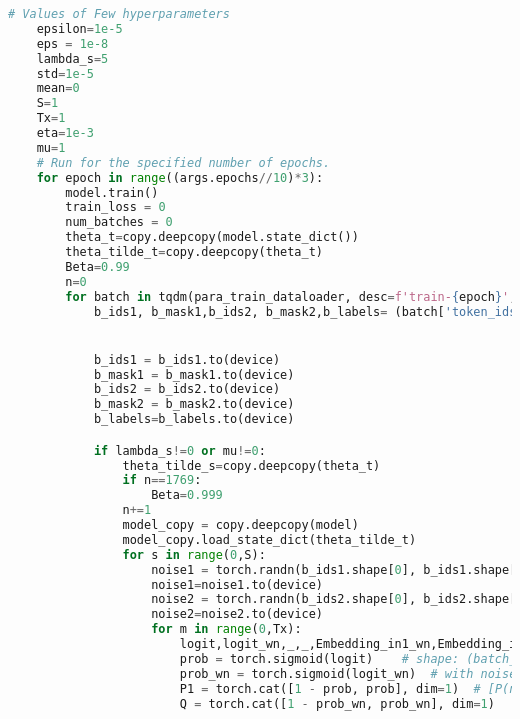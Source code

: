 \begin{lstlisting}[language=Python, caption={Paraphrase Detection Training with SMART}, label={lst:QQP_SMART}, basicstyle=\ttfamily\small, keywordstyle=\color{blue}, commentstyle=\color{green}, stringstyle=\color{red},linewidth=\textwidth]
    # Values of Few hyperparameters
    epsilon=1e-5
    eps = 1e-8
    lambda_s=5
    std=1e-5
    mean=0
    S=1
    Tx=1
    eta=1e-3
    mu=1
    # Run for the specified number of epochs.
    for epoch in range((args.epochs//10)*3):
        model.train()
        train_loss = 0
        num_batches = 0
        theta_t=copy.deepcopy(model.state_dict())
        theta_tilde_t=copy.deepcopy(theta_t)
        Beta=0.99
        n=0
        for batch in tqdm(para_train_dataloader, desc=f'train-{epoch}', disable=TQDM_DISABLE):
            b_ids1, b_mask1,b_ids2, b_mask2,b_labels= (batch['token_ids_1'], batch['attention_mask_1'],batch['token_ids_2'], batch['attention_mask_2'],batch['labels'])


            b_ids1 = b_ids1.to(device)
            b_mask1 = b_mask1.to(device)
            b_ids2 = b_ids2.to(device)
            b_mask2 = b_mask2.to(device)
            b_labels=b_labels.to(device)

            if lambda_s!=0 or mu!=0:
                theta_tilde_s=copy.deepcopy(theta_t)
                if n==1769:
                    Beta=0.999
                n+=1
                model_copy = copy.deepcopy(model)
                model_copy.load_state_dict(theta_tilde_t)
                for s in range(0,S):
                    noise1 = torch.randn(b_ids1.shape[0], b_ids1.shape[1], 768)*std+mean
                    noise1=noise1.to(device)
                    noise2 = torch.randn(b_ids2.shape[0], b_ids2.shape[1], 768)*std+mean
                    noise2=noise2.to(device)
                    for m in range(0,Tx):
                        logit,logit_wn,_,_,Embedding_in1_wn,Embedding_in2_wn = model.predict_paraphrase(b_ids1, b_mask1, b_ids2, b_mask2, noise1, noise2)
                        prob = torch.sigmoid(logit)    # shape: (batch_size, 1)
                        prob_wn = torch.sigmoid(logit_wn)  # with noise
                        P1 = torch.cat([1 - prob, prob], dim=1)  # [P(not paraphrase), P(paraphrase)]
                        Q = torch.cat([1 - prob_wn, prob_wn], dim=1)


\end{lstlisting}
